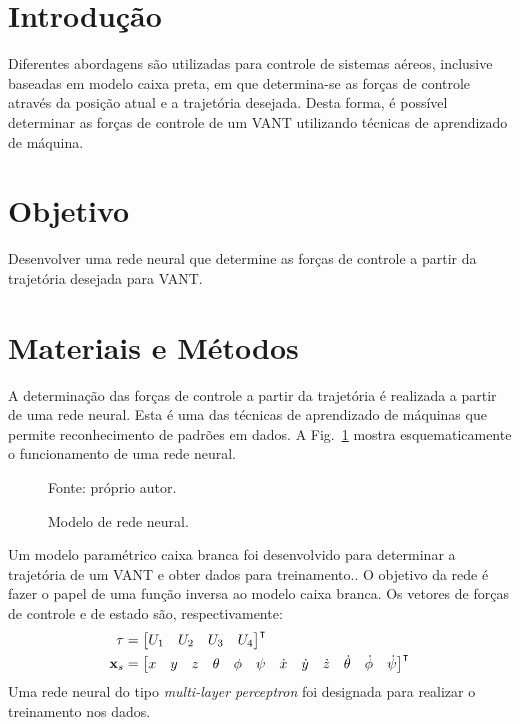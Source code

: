 \section{Introdução}

Diferentes abordagens são utilizadas para controle de sistemas aéreos, inclusive baseadas em modelo caixa preta, em que determina-se as forças de controle através da posição atual e a trajetória desejada.
Desta forma, é possível determinar as forças de controle de um VANT utilizando técnicas de aprendizado de máquina.

\section{Objetivo}

Desenvolver uma rede neural que determine as forças de controle a partir da trajetória desejada para VANT.

\section{Materiais e Métodos}

A determinação das forças de controle a partir da trajetória é realizada a partir de uma rede neural.
Esta é uma das técnicas de aprendizado de máquinas que permite reconhecimento de padrões em dados. A Fig.~\ref{fig:rede_neural} mostra esquematicamente o funcionamento de uma rede neural.\supercite{haykin1999}
%
\begin{figure}[H]
    \centering
    \caption{Modelo de rede neural.}
    

    {\footnotesize Fonte: próprio autor.}
    \label{fig:rede_neural}
\end{figure}
%
Um modelo paramétrico caixa branca foi desenvolvido para determinar a trajetória de um VANT e obter dados para treinamento.\supercite{geronel2023}.
O objetivo da rede é fazer o papel de uma função inversa ao modelo caixa branca. 
Os vetores de forças de controle e de estado são, respectivamente:
%
\begin{align}
    \tau &= \begin{bmatrix}
        U_1 & U_2 & U_3 & U_4 
    \end{bmatrix}^{\intercal} \\ 
    \setcounter{MaxMatrixCols}{20}
    \mathbf{x}_s &= \begin{bmatrix}
        x & y & z & \theta & \phi & \psi & \dot{x} & \dot{y} & \dot{z} & \dot{\theta} & \dot{\phi} & \dot{\psi}
    \end{bmatrix}^{\intercal}
\end{align}
%
Uma rede neural do tipo \emph{multi-layer perceptron} foi designada para realizar o treinamento nos dados.

